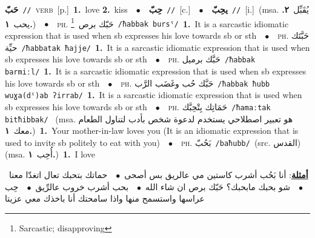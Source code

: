 \documentclass[10pt,a4paper,twoside]{article} %
\begin{document}
\begin{multicols}{2}
{\setlength\topsep{0pt}\textbf{\foreignlanguage{arabic}{حَبّ}}\ {\color{gray}\texttt{//}\color{black}}\ \textsc{verb}\ [p.]\ \textbf{1.}~love  \textbf{2.}~kiss\ \ $\bullet$\ \ \setlength\topsep{0pt}\textbf{\foreignlanguage{arabic}{حِبّ}}\ {\color{gray}\texttt{//}\color{black}}\ [c.]\ \ $\bullet$\ \ \setlength\topsep{0pt}\textbf{\foreignlanguage{arabic}{يحِبّ}}\ {\color{gray}\texttt{//}\color{black}}\ [i.]\ \color{gray}(msa. \foreignlanguage{arabic}{يُقَبِّل}~\foreignlanguage{arabic}{\textbf{٢.}}  \foreignlanguage{arabic}{يحب}~\foreignlanguage{arabic}{\textbf{١.}})\color{black}\ \ $\bullet$\ \ \textsc{ph.} \color{gray} \foreignlanguage{arabic}{حَبّك برص}\color{black}\ \footnote{Sarcastic; disapproving}\ {\color{gray}\texttt{/{\sffamily ħabbak bursˤ}/}\color{black}}\ \textbf{1.}~It is a sarcastic idiomatic expression that is used when sb expresses his love towards sb or sth\ \ $\bullet$\ \ \textsc{ph.} \color{gray} \foreignlanguage{arabic}{حَبَّتَك حيِّة}\color{black}\ {\color{gray}\texttt{/{\sffamily ħabbatak ħajje}/}\color{black}}\ \textbf{1.}~It is a sarcastic idiomatic expression that is used when sb expresses his love towards sb or sth\ \ $\bullet$\ \ \textsc{ph.} \color{gray} \foreignlanguage{arabic}{حَبَّك برميل}\color{black}\ {\color{gray}\texttt{/{\sffamily ħabbak barmiːl}/}\color{black}}\ \textbf{1.}~It is a sarcastic idiomatic expression that is used when sb expresses his love towards sb or sth\ \ $\bullet$\ \ \textsc{ph.} \color{gray} \foreignlanguage{arabic}{حَبَّك حُب وغَضَب الرَّب}\color{black}\ {\color{gray}\texttt{/{\sffamily ħabbak ħubb wuɣa(dˤ)ab ʔirrab}/}\color{black}}\ \textbf{1.}~It is a sarcastic idiomatic expression that is used when sb expresses his love towards sb or sth\ \ $\bullet$\ \ \textsc{ph.} \color{gray} \foreignlanguage{arabic}{حَمَاتِك بِتْحِبَّك}\color{black}\ {\color{gray}\texttt{/{\sffamily ħamaːtak bitħibbak}/}\color{black}}\ \color{gray} (msa. \foreignlanguage{arabic}{هو تعبير اصطلاحي يستخدم لدعوة شخص بأدب لتناول الطعام معك}~\foreignlanguage{arabic}{\textbf{١.}})\color{black}\ \textbf{1.}~Your mother-in-law loves you (It is an idiomatic expression that is used to invite sb politely to eat with you)\ \ $\bullet$\ \ \textsc{ph.} \color{gray} \foreignlanguage{arabic}{بَحُبّ}\color{black}\ {\color{gray}\texttt{/{\sffamily baħubb}/}\color{black}}\ \color{gray}(src. \foreignlanguage{arabic}{القدس})\color{black}\ \color{gray} (msa. \foreignlanguage{arabic}{أُحِب}~\foreignlanguage{arabic}{\textbf{١.}})\color{black}\ \textbf{1.}~I love\  \begin{flushright}\color{gray}\foreignlanguage{arabic}{\textbf{\underline{\foreignlanguage{arabic}{أمثلة}}}: أنا بَحُب أشرب كاستين مي عالريق بس أصحى\ $\bullet$\ \  حماتك بتحبك تعال اتغدّا معنا\ $\bullet$\ \  شو بحبك مابحبك؟ حَبّك برص ان شاء الله\ $\bullet$\ \  بحب أشرب خروب عالرِّيق\ $\bullet$\ \  حِب عراسها واستسمح منها واذا سامحتك أنا باخذك معي عزيتا}\end{flushright}\color{black}} \vspace{2mm}


\end{multicols}
\end{document}
